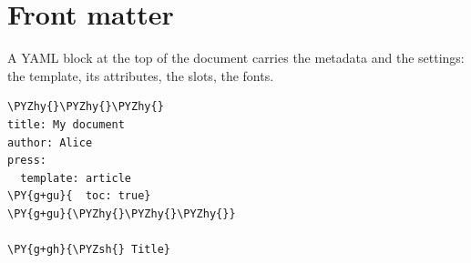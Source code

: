 \documentclass[a4paper,twoside]{article}
\begin{document}
\section{Front matter}
A YAML block at the top of the document carries the metadata and the  settings: the template, its attributes, the slots, the fonts.
\begin{tscode}[lang=md, engine=pygments]
\begin{Verbatim}[commandchars=\\\{\},breaklines, breakanywhere, commandchars=\\\{\}]
\PYZhy{}\PYZhy{}\PYZhy{}
title: My document
author: Alice
press:
  template: article
\PY{g+gu}{  toc: true}
\PY{g+gu}{\PYZhy{}\PYZhy{}\PYZhy{}}

\PY{g+gh}{\PYZsh{} Title}
\end{Verbatim}
\end{tscode}
\printglossary[type=\acronymtype]
\end{document}
